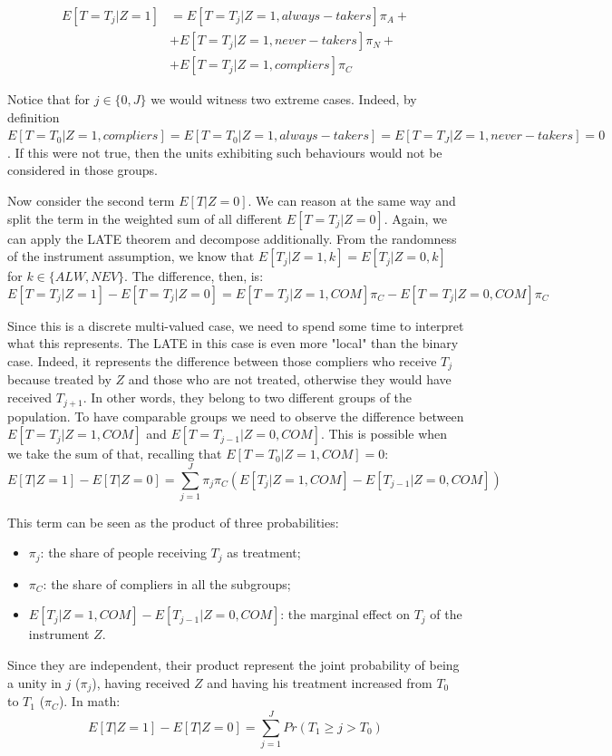 \documentclass[a4paper,12pt,oneside,English]{article}
\begin{document}
\[
\begin{split}
E[T=T_j|Z=1]&=E[T=T_j|Z=1, always-takers]\pi_A+\\&+E[T=T_j|Z=1, never-takers]\pi_N+\\&+E[T=T_j|Z=1, compliers]\pi_C
\end{split}
\]

Notice that for $j\in\{0,J\}$ we would witness two extreme cases. Indeed, by definition $E[T=T_0|Z=1, compliers]=E[T=T_0|Z=1, always-takers]=E[T=T_J|Z=1, never-takers]=0$. If this were not true, then the units exhibiting such behaviours would not be considered in those groups.

Now consider the second term $E[T|Z=0]$. We can reason at the same way and split the term in the weighted sum of all different $E[T=T_j|Z=0]$. Again, we can apply the LATE theorem and decompose additionally. From the randomness of the instrument assumption, we know that $E[T_j|Z=1, k]=E[T_j|Z=0, k]$ for $k\in\{ALW,NEV\}$. The difference, then, is:
\[
E[T=T_j|Z=1]-E[T=T_j|Z=0]=E[T=T_j|Z=1, COM]\pi_C-E[T=T_j|Z=0, COM]\pi_C
\]

Since this is a discrete multi-valued case, we need to spend some time to interpret what this represents. The LATE in this case is even more "local" than the binary case. Indeed, it represents the difference between those compliers who receive $T_j$ because treated by $Z$ and those who are not treated, otherwise they would have received $T_{j+1}$. In other words, they belong to two different groups of the population. To have comparable groups we need to observe the difference between $E[T=T_j|Z=1, COM]$ and $E[T=T_{j-1}|Z=0, COM]$. This is possible when we take the sum of that, recalling that $E[T=T_0|Z=1, COM]=0$:
\[
E[T|Z=1]-E[T|Z=0]=\sum_{j=1}^J \pi_j \pi_C(E[T_j|Z=1, COM]-E[T_{j-1}|Z=0, COM])
\]

This term can be seen as the product of three probabilities:
\begin{itemize}
    \item $\pi_j$: the share of people receiving $T_j$ as treatment;
    \item $\pi_C$: the share of compliers in all the subgroups;
    \item $E[T_j|Z=1, COM]-E[T_{j-1}|Z=0, COM]$: the marginal effect on $T_j$ of the instrument $Z$.
\end{itemize}

Since they are independent, their product represent the joint probability of being a unity in $j$ ($\pi_j$), having received $Z$ and having his treatment increased from $T_0$ to $T_1$ ($\pi_C$). In math:
\begin{equation}
E[T|Z=1]-E[T|Z=0]=\sum_{j=1}^J Pr(T_1\geq j>T_0) 
\label{eq2}    
\end{equation}
\end{document}
